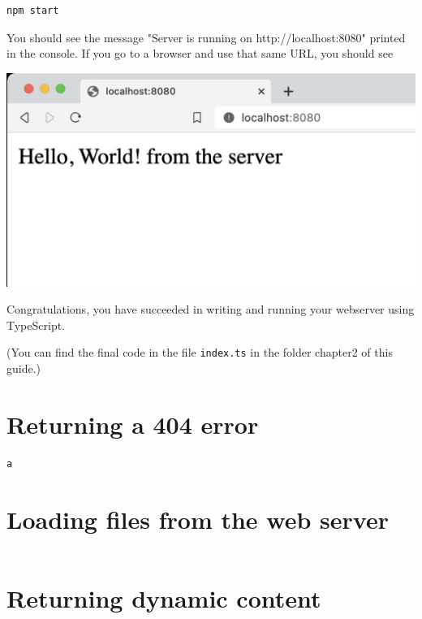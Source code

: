 \documentclass[12pt,a5paper]{memoir}
\begin{document}
\begin{enumerate}
\begin{lstlisting}[language=bash]
npm start
\end{lstlisting}
  
You should see the message "Server is running on http://localhost:8080" printed
  in the console. If you go to a browser and use that same URL, you should see 
  
\includegraphics[width=\linewidth]{WebServer1.jpg}
  
  Congratulations, you have succeeded in writing and running
  your webserver using TypeScript.

  (You can find the final code in the file \texttt{index.ts} in the folder
  chapter2 of this guide.)

\end{enumerate}

\chapter{Returning a 404 error}

\begin{lstlisting}
a
\end{lstlisting}

\chapter{Loading files from the web server}

\begin{lstlisting}

\end{lstlisting}


  


\chapter{Returning dynamic content}
\end{document}
